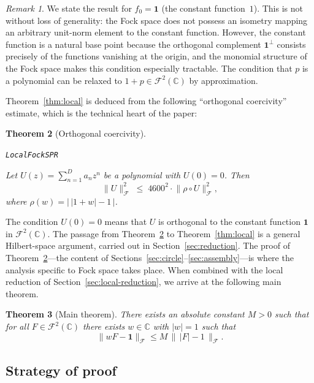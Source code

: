 \documentclass[11pt]{amsart}
\newtheorem{theorem}{Theorem}[section]
\theoremstyle{definition}
\theoremstyle{remark}
\newtheorem{remark}[theorem]{Remark}
\begin{document}
\begin{remark}\label{rem:wlog}
We state the result for $f_0 = \mathbf{1}$ (the constant function~$1$).
This is not without loss of generality: the Fock space does not possess an
isometry mapping an arbitrary unit-norm element to the constant function.
However, the constant function is a natural base point because the orthogonal
complement $\mathbf{1}^\perp$ consists precisely of the functions vanishing at
the origin, and the monomial structure of the Fock space makes this condition
especially tractable.  The condition that $p$ is a polynomial can be
relaxed to $1 + p \in \mathcal{F}^2(\mathbb{C})$ by approximation.
\end{remark}

Theorem~\ref{thm:local} is deduced from the following ``orthogonal
coercivity'' estimate, which is the technical heart of the paper:

\begin{theorem}[Orthogonal coercivity]\label{thm:orthog}
\par\noindent\texttt{LocalFockSPR}\par\smallskip
Let $U(z) = \sum_{n=1}^D a_n z^n$ be a polynomial with $U(0) = 0$.  Then
\[
\lVert U \rVert_\mathcal{F}^2
\;\le\;
4600^2 \cdot
\lVert \rho \circ U \rVert_\mathcal{F}^2,
\]
where $\rho(w) = \bigl\lvert\, \lvert 1+w \rvert - 1 \,\bigr\rvert$.
\end{theorem}

The condition $U(0) = 0$ means that $U$ is orthogonal to the constant
function $\mathbf{1}$ in $\mathcal{F}^2(\mathbb{C})$.  The passage from
Theorem~\ref{thm:orthog} to Theorem~\ref{thm:local} is a general
Hilbert-space argument, carried out in Section~\ref{sec:reduction}.  The
proof of Theorem~\ref{thm:orthog}---the content of
Sections~\ref{sec:circle}--\ref{sec:assembly}---is where the analysis
specific to Fock space takes place.  When combined with the local reduction
of Section~\ref{sec:local-reduction}, we arrive at the following main
theorem.

\begin{theorem}[Main theorem]\label{thm:main}
There exists an absolute constant \(M>0\) such that for all
\(F\in\mathcal{F}^2(\mathbb{C})\) there exists \(w\in\mathbb{C}\) with \(\lvert w \rvert=1\) such that
\[
\lVert wF-\mathbf 1 \rVert_{\mathcal{F}}
\le
M\,\bigl\|\,\lvert F \rvert-1\,\bigr\|_{\mathcal{F}}.
\]
\end{theorem}

\subsection{Strategy of proof}\label{sec:strategy}
\end{document}
